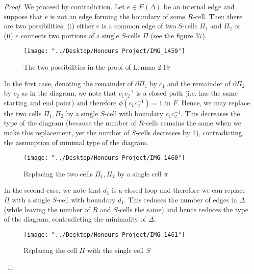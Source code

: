 \documentclass[12pt]{article}
\newcommand{\vs}{\vskip10pt}
\begin{document}
	\begin{proof}
		
		We proceed by contradiction. Let $e \in E(\Delta)$ be an internal edge and suppose that $e$ is not an edge forming the boundary of some $R$-cell. Then there are two possibilities: (i) either $e$ is a common edge of two $S$-cells $\Pi_1$ and $\Pi_2$ or (ii) $e$ connects two portions of a single $S$-cells $\Pi$ (see the figure 37). 
		
		
\begin{figure} [H]
	\centering
	\texttt{[image: "../Desktop/Honours Project/IMG\_1459"]}
	\caption{The two possibilities in the proof of Lemma 2.19}
	\label{fig:img1459}
\end{figure}

		
		\vs 
		
		In the first case, denoting the remainder of $\partial \Pi_1$ by $c_1$ and the remainder of $\partial \Pi_2$ by $c_2$ as in the diagram, we note that $c_1 c_2^{-1}$ is a closed path (i.e. has the same starting and end point) and therefore $\phi(c_1c_2^{-1}) = 1$ in $F$. Hence, we may replace the two cells $\Pi_1, \Pi_2$ by a single $S$-cell with boundary $c_1 c_2^{-1}$. This decreases the type of the diagram (because the number of $R$-cells remains the same when we make this replacement, yet the number of $S$-cells decreases by 1), contradicting the assumption of minimal type of the diagram. 
		
		\begin{figure} [H]
			\centering
			\texttt{[image: "../Desktop/Honours Project/IMG\_1460"]}
			\caption{Replacing the two cells $\Pi_1, \Pi_2$ by a single cell $\pi$}
			\label{fig:img1460}
		\end{figure}
		
		\vs 
		
		In the second case, we note that $d_1$ is a closed loop and therefore we can replace $\Pi$ with a single $S$-cell with boundary $d_1$. This reduces the number of edges in $\Delta$ (while leaving the number of $R$ and $S$-cells the same) and hence reduces the type of the diagram, contradicting the minimality of $\Delta$.
		
\begin{figure} [H]
	\centering
	\texttt{[image: "../Desktop/Honours Project/IMG\_1461"]}
	\caption{Replacing the cell $\Pi$ with the single cell $S$}
	\label{fig:img1461}
\end{figure}
		
	\end{proof}
\end{document}
